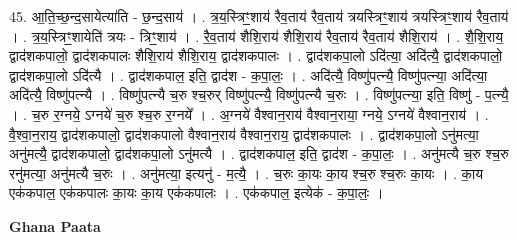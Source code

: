 \documentclass[17pt]{extarticle}
\begin{document}
45. आ॒ति॒च्छ॒न्द॒सायेत्या॑ति - छ॒न्द॒साय॑ । . त्र॒य॒स्त्रिꣳ॒॒शाय॑ रैव॒ताय॑ रैव॒ताय॑ त्रयस्त्रिꣳ॒॒शाय॑ त्रयस्त्रिꣳ॒॒शाय॑ रैव॒ताय॑ । . त्र॒य॒स्त्रिꣳ॒॒शायेति॑ त्रयः - त्रिꣳ॒॒शाय॑ । . रै॒व॒ताय॑ शैशि॒राय॑ शैशि॒राय॑ रैव॒ताय॑ रैव॒ताय॑ शैशि॒राय॑ । . शै॒शि॒राय॒ द्वाद॑शकपालो॒ द्वाद॑शकपालः शैशि॒राय॑ शैशि॒राय॒ द्वाद॑शकपालः । . द्वाद॑शकपा॒लो ऽदि॑त्या॒ अदि॑त्यै॒ द्वाद॑शकपालो॒ द्वाद॑शकपा॒लो ऽदि॑त्यै । . द्वाद॑शकपाल॒ इति॒ द्वाद॑श - क॒पा॒लः॒ । . अदि॑त्यै॒ विष्णु॑पत्न्यै॒ विष्णु॑पत्न्या॒ अदि॑त्या॒ अदि॑त्यै॒ विष्णु॑पत्न्यै । . विष्णु॑पत्न्यै च॒रु श्च॒रुर् विष्णु॑पत्न्यै॒ विष्णु॑पत्न्यै च॒रुः । . विष्णु॑पत्न्या॒ इति॒ विष्णु॑ - प॒त्न्यै॒ । . च॒रु र॒ग्नये॒ ऽग्नये॑ च॒रु श्च॒रु र॒ग्नये᳚ । . अ॒ग्नये॑ वैश्वान॒राय॑ वैश्वान॒राया॒ ग्नये॒ ऽग्नये॑ वैश्वान॒राय॑ । . वै॒श्वा॒न॒राय॒ द्वाद॑शकपालो॒ द्वाद॑शकपालो वैश्वान॒राय॑ वैश्वान॒राय॒ द्वाद॑शकपालः । . द्वाद॑शकपा॒लो ऽनु॑मत्या॒ अनु॑मत्यै॒ द्वाद॑शकपालो॒ द्वाद॑शकपा॒लो ऽनु॑मत्यै । . द्वाद॑शकपाल॒ इति॒ द्वाद॑श - क॒पा॒लः॒ । . अनु॑मत्यै च॒रु श्च॒रु रनु॑मत्या॒ अनु॑मत्यै च॒रुः । . अनु॑मत्या॒ इत्यनु॑ - म॒त्यै॒ । . च॒रुः का॒यः का॒य श्च॒रु श्च॒रुः का॒यः । . का॒य एक॑कपाल॒ एक॑कपालः का॒यः का॒य एक॑कपालः । . एक॑कपाल॒ इत्येक॑ - क॒पा॒लः॒ । \newline

\textbf{Ghana Paata } \newline
\end{document}
